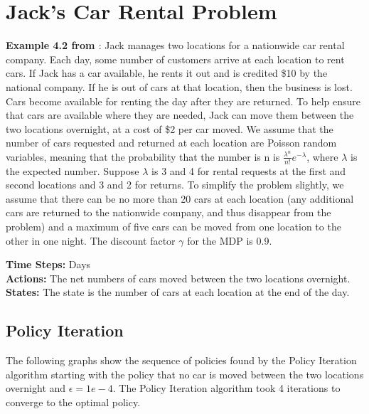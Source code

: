 \documentclass{article}
\newcommand{\citecustom}[1]{\citeauthor{#1} \cite{#1}}
\begin{document}
\section{Jack's Car Rental Problem}
\textbf{Example 4.2 from \citecustom{sutton2018reinforcement}}: Jack manages two locations for a nationwide car
rental company. Each day, some number of customers arrive at each location to rent cars.
If Jack has a car available, he rents it out and is credited \$10 by the national company.
If he is out of cars at that location, then the business is lost. Cars become available for
renting the day after they are returned. To help ensure that cars are available where
they are needed, Jack can move them between the two locations overnight, at a cost of
\$2 per car moved. We assume that the number of cars requested and returned at each
location are Poisson random variables, meaning that the probability that the number is
n is $\frac{\lambda^{n}}{n!}e^{-\lambda}$, where $\lambda$ is the expected number. Suppose $\lambda$ is 3 and 4 for rental requests at
the first and second locations and 3 and 2 for returns. To simplify the problem slightly,
we assume that there can be no more than 20 cars at each location (any additional cars
are returned to the nationwide company, and thus disappear from the problem) and a
maximum of five cars can be moved from one location to the other in one night. The discount factor $\gamma$ for the MDP is 0.9.\par
	
\noindent %
\textbf{Time Steps:} Days \\
\textbf{Actions:} The net numbers of cars moved between the two locations overnight. \\
\textbf{States:} The state is the number of cars at each location at the end of the day. 

\subsection{Policy Iteration}
The following graphs show the sequence of policies found by the Policy Iteration algorithm starting with the policy that no car
is moved between the two locations overnight and $\epsilon=1e-4$. The Policy Iteration algorithm took 4 iterations to converge
to the optimal policy.
\end{document}
